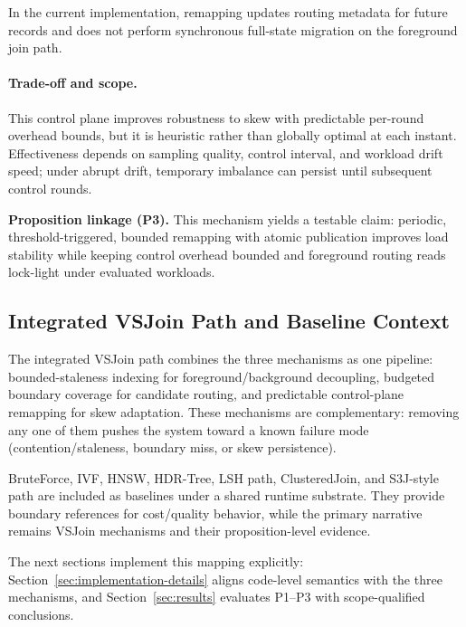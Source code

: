 In the current implementation, remapping updates routing metadata for future records and does not perform synchronous full-state migration on the foreground join path.

\paragraph{Trade-off and scope.}
This control plane improves robustness to skew with predictable per-round overhead bounds, but it is heuristic rather than globally optimal at each instant. Effectiveness depends on sampling quality, control interval, and workload drift speed; under abrupt drift, temporary imbalance can persist until subsequent control rounds.

\noindent\textbf{Proposition linkage (P3).}
This mechanism yields a testable claim: periodic, threshold-triggered, bounded remapping with atomic publication improves load stability while keeping control overhead bounded and foreground routing reads lock-light under evaluated workloads.

\subsection{Integrated VSJoin Path and Baseline Context}

The integrated VSJoin path combines the three mechanisms as one pipeline: bounded-staleness indexing for foreground/background decoupling, budgeted boundary coverage for candidate routing, and predictable control-plane remapping for skew adaptation. These mechanisms are complementary: removing any one of them pushes the system toward a known failure mode (contention/staleness, boundary miss, or skew persistence).

BruteForce, IVF, HNSW, HDR-Tree, LSH path, ClusteredJoin, and S3J-style path are included as baselines under a shared runtime substrate. They provide boundary references for cost/quality behavior, while the primary narrative remains VSJoin mechanisms and their proposition-level evidence.

The next sections implement this mapping explicitly: Section~\ref{sec:implementation-details} aligns code-level semantics with the three mechanisms, and Section~\ref{sec:results} evaluates P1--P3 with scope-qualified conclusions.
